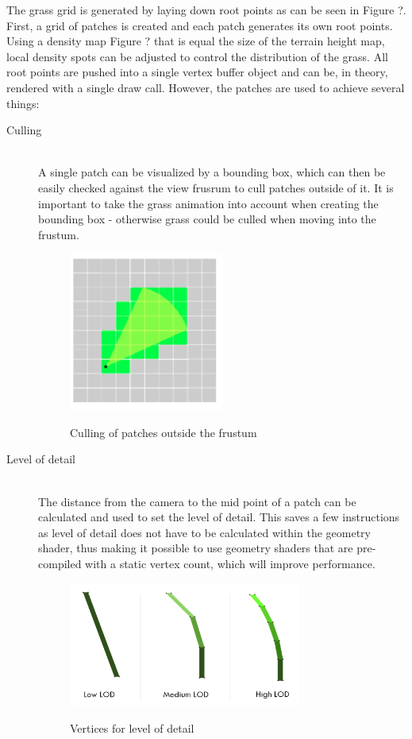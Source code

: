 \documentclass[conference]{acmsiggraph}
\begin{document}
The grass grid is generated by laying down root points as can be seen in Figure {?}. First, a grid of patches is created and each patch generates its own root points. Using a density map {Figure ?} that is equal the size of the terrain height map, local density spots can be adjusted to control the distribution of the grass. All root points are pushed into a single vertex buffer object and can be, in theory, rendered with a single draw call. However, the patches are used to achieve several things:

\begin{description}
  \item[Culling] \hfill \\
  A single patch can be visualized by a bounding box, which can then be easily checked against the view frusrum to cull patches outside of it. It is important to take the grass animation into account when creating the bounding box - otherwise grass could be culled when moving into the frustum.
   \begin{figure}[ht]
   \centering
   \includegraphics[width=2.0in]{images/culling}
   \caption{Culling of patches outside the frustum} \cite{EddieLee}
 \end{figure}    
  
  \item[Level of detail] \hfill \\
  The distance from the camera to the mid point of a patch can be calculated and used to set the level of detail. This saves a few instructions as level of detail does not have to be calculated within the geometry shader, thus making it possible to use geometry shaders that are pre-compiled with a static vertex count, which will improve performance.

 \begin{figure}[ht]
   \centering
   \includegraphics[width=3.0in]{images/lod}
   \caption{Vertices for level of detail} \cite{EddieLee}
 \end{figure}  
  

\end{description}
\end{document}
